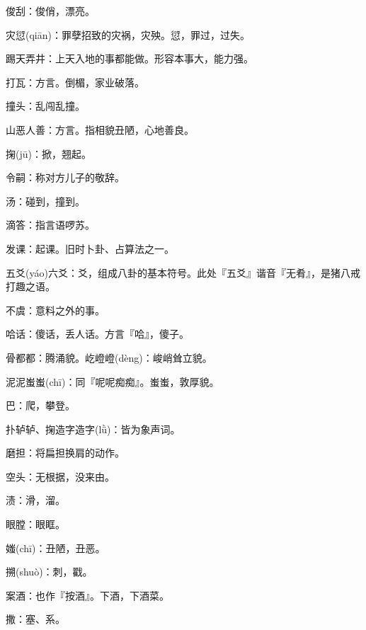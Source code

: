 \startbuffer[787]
俊刮：俊俏，漂亮。
\stopbuffer


\startbuffer[788]
灾愆(qiān)：罪孽招致的灾祸，灾殃。愆，罪过，过失。
\stopbuffer


\startbuffer[789]
踢天弄井：上天入地的事都能做。形容本事大，能力强。
\stopbuffer


\startbuffer[790]
打瓦：方言。倒楣，家业破落。
\stopbuffer


\startbuffer[791]
撞头：乱闯乱撞。
\stopbuffer


\startbuffer[792]
山恶人善：方言。指相貌丑陋，心地善良。
\stopbuffer


\startbuffer[793]
掬(jū)：掀，翘起。
\stopbuffer


\startbuffer[794]
令嗣：称对方儿子的敬辞。
\stopbuffer


\startbuffer[795]
汤：碰到，撞到。
\stopbuffer


\startbuffer[796]
滴答：指言语啰苏。
\stopbuffer


\startbuffer[797]
发课：起课。旧时卜卦、占算法之一。
\stopbuffer


\startbuffer[798]
五爻(yáo)六爻：爻，组成八卦的基本符号。此处『五爻』谐音『无肴』，是猪八戒打趣之语。
\stopbuffer


\startbuffer[799]
不虞：意料之外的事。
\stopbuffer


\startbuffer[800]
哈话：傻话，丢人话。方言『哈』，傻子。
\stopbuffer


\startbuffer[801]
骨都都：腾涌貌。屹嶝嶝(dèng)：峻峭耸立貌。
\stopbuffer


\startbuffer[802]
泥泥蚩蚩(chī)：同『呢呢痴痴』。蚩蚩，敦厚貌。
\stopbuffer


\startbuffer[803]
巴：爬，攀登。
\stopbuffer


\startbuffer[804]
扑轳轳、掬造字造字(lǜ)：皆为象声词。
\stopbuffer


\startbuffer[805]
磨担：将扁担换肩的动作。
\stopbuffer


\startbuffer[806]
空头：无根据，没来由。
\stopbuffer


\startbuffer[807]
渍：滑，溜。
\stopbuffer


\startbuffer[808]
眼膛：眼眶。
\stopbuffer


\startbuffer[809]
媸(chī)：丑陋，丑恶。
\stopbuffer


\startbuffer[810]
搠(shuò)：刺，戳。
\stopbuffer


\startbuffer[811]
案酒：也作『按酒』。下酒，下酒菜。
\stopbuffer


\startbuffer[812]
撒：塞、系。
\stopbuffer


